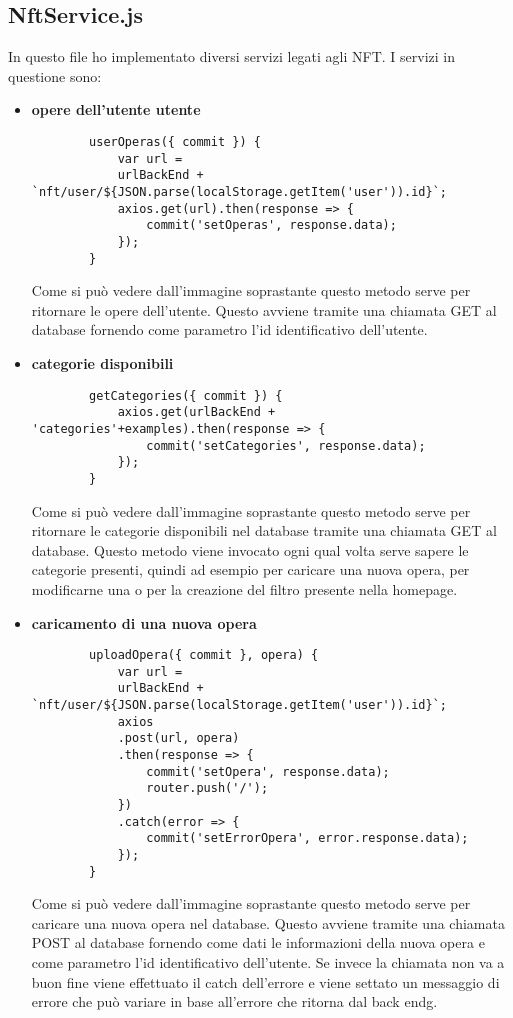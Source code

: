 \subsection{NftService.js}
In questo file ho implementato diversi servizi legati agli NFT. I servizi in questione sono:
\begin{itemize}
	\item \textbf{opere dell'utente utente}
	\begin{lstlisting}
		userOperas({ commit }) {
			var url =
			urlBackEnd + `nft/user/${JSON.parse(localStorage.getItem('user')).id}`;
			axios.get(url).then(response => {
				commit('setOperas', response.data);
			});
		}
	\end{lstlisting}
	Come si può vedere dall'immagine soprastante questo metodo serve per ritornare le opere dell'utente. Questo avviene tramite una chiamata GET al database fornendo come parametro l'id identificativo dell'utente.
	\item \textbf{categorie disponibili}
	\begin{lstlisting}
		getCategories({ commit }) {
			axios.get(urlBackEnd + 'categories'+examples).then(response => {
				commit('setCategories', response.data);
			});
		}
	\end{lstlisting}
	Come si può vedere dall'immagine soprastante questo metodo serve per ritornare le categorie disponibili nel database tramite una chiamata GET al database. Questo metodo viene invocato ogni qual volta serve sapere le categorie presenti, quindi ad esempio per caricare una nuova opera, per modificarne una o per la creazione del filtro presente nella homepage.
	\item \textbf{caricamento di una nuova opera}
	\begin{lstlisting}
		uploadOpera({ commit }, opera) {
			var url =
			urlBackEnd + `nft/user/${JSON.parse(localStorage.getItem('user')).id}`;
			axios
			.post(url, opera)
			.then(response => {
				commit('setOpera', response.data);
				router.push('/');
			})
			.catch(error => {
				commit('setErrorOpera', error.response.data);
			});
		}
	\end{lstlisting}
	Come si può vedere dall'immagine soprastante questo metodo serve per caricare una nuova opera nel database. Questo avviene tramite una chiamata POST al database fornendo come dati le informazioni della nuova opera e come parametro l'id identificativo dell'utente. Se invece  la chiamata non va a buon fine viene effettuato il catch dell'errore e viene settato un messaggio di errore che può variare in base all'errore che ritorna dal \gls{back endg}.

\end{itemize}
